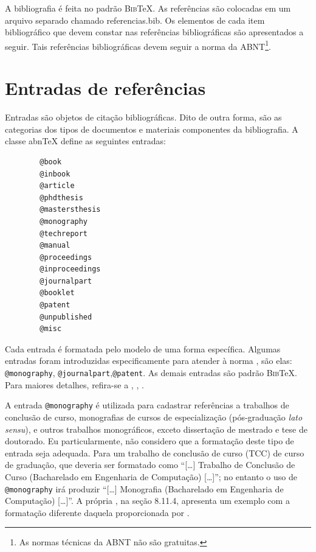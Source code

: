 \begin{apendicesenv}
    A bibliografia é feita no padrão \textsc{Bib}\TeX{}.
    As referências são colocadas em um arquivo separado chamado {\color{red} referencias.bib}.
    Os elementos de cada item bibliográfico que devem constar nas referências bibliográficas são apresentados a seguir.
    Tais referências bibliográficas devem seguir a norma  da ABNT\footnote{As normas técnicas da ABNT não são gratuitas.}.

    \section{Entradas de referências}
    \label{sec_entradas_de_referencias}

    Entradas são objetos de citação bibliográficas.
    Dito de outra forma, são as categorias dos tipos de documentos e materiais componentes da bibliografia.
    A classe abn\TeX{} define as seguintes entradas:

    \begin{verbatim}
        @book
        @inbook
        @article
        @phdthesis
        @mastersthesis
        @monography
        @techreport
        @manual
        @proceedings
        @inproceedings
        @journalpart
        @booklet
        @patent
        @unpublished
        @misc
    \end{verbatim}

    Cada entrada é formatada pelo modelo de uma forma específica.
    Algumas entradas foram introduzidas especificamente para atender à norma , são elas: \verb|@monography|, \verb|@journalpart|,\verb|@patent|.
    As demais entradas são padrão \textsc{Bib}\TeX{}.
    Para maiores detalhes, refira-se a , , .

    A entrada \verb|@monography| é utilizada para cadastrar referências a trabalhos de conclusão de curso, monografias de cursos de especialização (pós-graduação \textit{lato sensu}), e outros trabalhos monográficos, exceto dissertação de mestrado e tese de doutorado.
    Eu particularmente, não considero que a formatação deste tipo de entrada seja adequada.
    Para um trabalho de conclusão de curso (TCC) de curso de graduação, que deveria ser formatado como ``[\ldots] Trabalho de Conclusão de Curso (Bacharelado em Engenharia de Computação) [\ldots]''; no entanto o uso de \verb|@monography| irá produzir ``[\ldots] Monografia (Bacharelado em Engenharia de Computação) [\ldots]''.
    A própria  , na seção 8.11.4, apresenta um exemplo com a formatação diferente daquela proporcionada por .


\end{apendicesenv}
